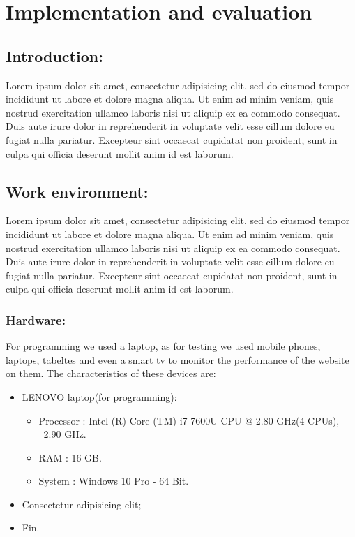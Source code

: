 \chapter{Implementation and evaluation}

\section{ Introduction:}
Lorem ipsum dolor sit amet, consectetur adipisicing elit, sed do eiusmod
tempor incididunt ut labore et dolore magna aliqua. Ut enim ad minim veniam,
quis nostrud exercitation ullamco laboris nisi ut aliquip ex ea commodo
consequat. Duis aute irure dolor in reprehenderit in voluptate velit esse
cillum dolore eu fugiat nulla pariatur. Excepteur sint occaecat cupidatat non
proident, sunt in culpa qui officia deserunt mollit anim id est laborum.


\section{Work environment:}
Lorem ipsum dolor sit amet, consectetur adipisicing elit, sed do eiusmod
tempor incididunt ut labore et dolore magna aliqua. Ut enim ad minim veniam,
quis nostrud exercitation ullamco laboris nisi ut aliquip ex ea commodo
consequat. Duis aute irure dolor in reprehenderit in voluptate velit esse
cillum dolore eu fugiat nulla pariatur. Excepteur sint occaecat cupidatat non
proident, sunt in culpa qui officia deserunt mollit anim id est laborum.

\subsection{Hardware:}
For programming we used a laptop, as for testing we used mobile phones, laptops, tabeltes and even a smart tv to monitor the performance of the website on them. The characteristics of
these devices are:
\begin{itemize}
	\item LENOVO laptop(for programming):
	\begin{itemize}
		\item Processor : Intel (R) Core (TM) i7-7600U CPU @ 2.80 GHz(4 CPUs), ~2.90 GHz.
		\item RAM : 16 GB.
		\item System : Windows 10 Pro - 64 Bit.
	\end{itemize}
	\item Consectetur adipisicing elit;
	\item Fin.
\end{itemize}



